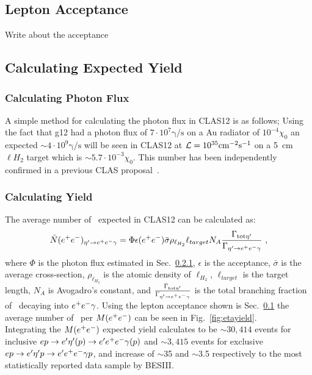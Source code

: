 \subsection{Lepton Acceptance}\label{sec.acceptance}
Write about the acceptance
\subsection{Calculating Expected Yield}
\subsubsection{Calculating Photon Flux}\label{sec:calflux}
A simple method for calculating the photon flux in CLAS12 is as follows; Using the fact that g12 had a photon flux of $7\cdot 10^7 \mathrm{\gamma/s}$ on a Au radiator of $10^{-4} \chi_0$ an expected $\sim 4\cdot 10^9  \mathrm{\gamma/s}$ will be seen in CLAS12 at ${\cal L} = 10^{35}\mathrm{cm^{-2}s^{-1}}$ on a 5~cm $\ell H_2$ target which is $\sim 5.7\cdot 10^{-3} \chi_0$. This number has been independently confirmed in a previous CLAS proposal~\cite{clas.proposal.meson}.
\subsubsection{Calculating Yield}
The average number of \etaDal \ expected in CLAS12 can be calculated as:
\begin{align}
\bar{N}(e^+e^-)_{\eta^{\prime} \to e^+e^- \gamma} = \Phi \epsilon(e^+e^-)\bar{\sigma} \rho_{\ell_{H_2}}\ell_{target}N_A \frac{\Gamma_{\mathrm{tot} \eta^{\prime}}}{\Gamma_{\eta^{\prime} \to e^+e^- \gamma}}\ ,
\end{align}
where $\Phi$ is the photon flux estimated in Sec.~\ref{sec:calflux}, $\epsilon$ is the acceptance, $\bar{\sigma}$ is the average cross-section, $\rho_{\ell_{H_2}}$ is the atomic density of $\ell_{H_2}$, $\ell_{target}$ is the target length, $N_A$ is Avogadro's constant, and $\frac{\Gamma_{\mathrm{tot} \eta^{\prime}}}{\Gamma_{\eta^{\prime} \to e^+e^- \gamma}}$ is the total branching fraction of \etaTP \  decaying into $e^+e^- \gamma$.
Using the lepton acceptance shown is Sec.~\ref{sec.acceptance} the average number of \etaTP \  per $M(e^+e^-)$ can be seen in Fig.~\ref{fig:etayield}.
\label{fig:etayield}\\
Integrating the $M(e^+e^-)$ expected yield calculates to be $\sim 30,414$ events for inclusive $ep\to e'\eta^{\prime} (p) \to e'e^+e^- \gamma(p)$ and $\sim 3,415$ events for exclusive $ep\to e'\eta^{\prime} p \to e'e^+e^- \gamma p$, and increase of $\sim$35 and $\sim$3.5 respectively to the most statistically reported data sample by BESIII. 

